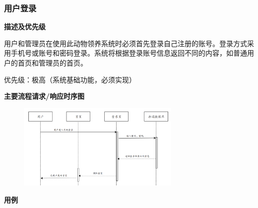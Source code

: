 \documentclass[12pt,a4paper,UTF8]{article}
\begin{document}
\subsubsection{用户登录}

\noindent\textbf{描述及优先级}

用户和管理员在使用此动物领养系统时必须首先登录自己注册的账号。登录方式采用手机号或账号和密码登录。系统将根据登录账号信息返回不同的内容，如普通用户的首页和管理员的首页。

优先级：极高（系统基础功能，必须实现）

\noindent\textbf{主要流程请求/响应时序图}

\begin{figure}[H]
  \centering
  \includegraphics[width=0.7\textwidth]{figures/use322.png}
\end{figure}

\noindent\textbf{用例}
\end{document}
